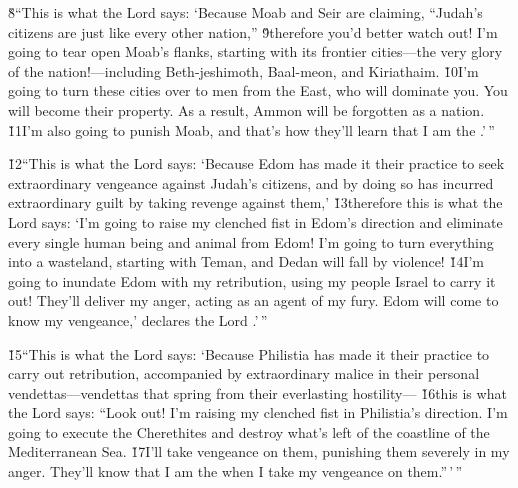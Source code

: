 \v{8}``This is what the Lord  says: `Because Moab and Seir are claiming, ``Judah's citizens are just like every other nation,'' \v{9}therefore you'd better watch out! I'm going to tear open Moab's flanks, starting with its frontier cities---the very glory of the nation!---including Beth-jeshimoth, Baal-meon, and Kiriathaim. \v{10}I'm going to turn these cities over to men from the East, who will dominate you. You will become their property. As a result, Ammon will be forgotten as a nation. \v{11}I'm also going to punish Moab, and that's how they'll learn that I am the .'\,''

\v{12}``This is what the Lord  says: `Because Edom has made it their practice to seek extraordinary vengeance against Judah's citizens, and by doing so has incurred extraordinary guilt by taking revenge against them,' \v{13}therefore this is what the Lord  says: `I'm going to raise my clenched fist in Edom's direction and eliminate every single human being and animal from Edom! I'm going to turn everything into a wasteland, starting with Teman, and Dedan will fall by violence! \v{14}I'm going to inundate Edom with my retribution, using my people Israel to carry it out! They'll deliver my anger, acting as an agent of my fury. Edom will come to know my vengeance,' declares the Lord .'\,''

\v{15}``This is what the Lord  says: `Because Philistia has made it their practice to carry out retribution, accompanied by extraordinary malice in their personal vendettas---vendettas that spring from their everlasting hostility--- \v{16}this is what the Lord  says: ``Look out! I'm raising my clenched fist in Philistia's direction. I'm going to execute the Cherethites and destroy what's left of the coastline of the Mediterranean Sea. \v{17}I'll take vengeance on them, punishing them severely in my anger. They'll know that I am the  when I take my vengeance on them.''\,'\,''

